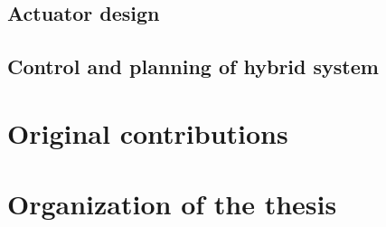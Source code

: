 \subsection{Actuator design}
\label{sec:ActuatorDesign}

\subsection{Control and planning of hybrid system}
\label{sec:ControlAndPlanningOfHybridSystem}



\section{Original contributions}
\label{sec:contribution}


\section{Organization of the thesis}
\label{sec:OrganisationOfTheThesis}




